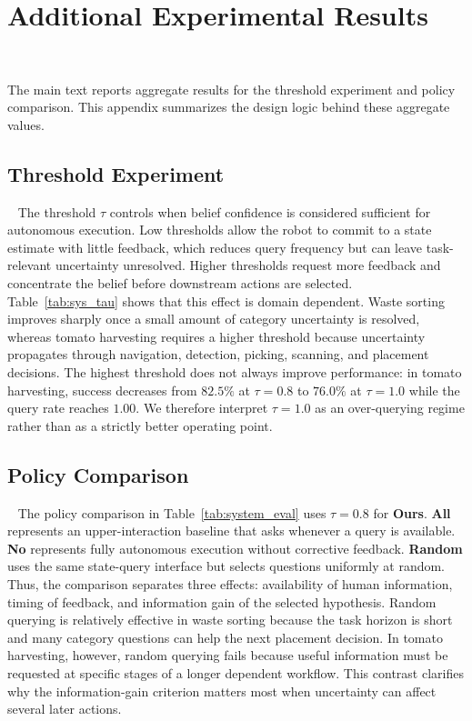 \section{Additional Experimental Results}~\label{appx:exp}

The main text reports aggregate results for the threshold experiment and policy comparison. This appendix summarizes the design logic behind these aggregate values.

\subsection{Threshold Experiment}~\label{appx:threshold_exp}
The threshold $\tau$ controls when belief confidence is considered sufficient for autonomous execution. Low thresholds allow the robot to commit to a state estimate with little feedback, which reduces query frequency but can leave task-relevant uncertainty unresolved. Higher thresholds request more feedback and concentrate the belief before downstream actions are selected. Table~\ref{tab:sys_tau} shows that this effect is domain dependent. Waste sorting improves sharply once a small amount of category uncertainty is resolved, whereas tomato harvesting requires a higher threshold because uncertainty propagates through navigation, detection, picking, scanning, and placement decisions. The highest threshold does not always improve performance: in tomato harvesting, success decreases from $82.5\%$ at $\tau=0.8$ to $76.0\%$ at $\tau=1.0$ while the query rate reaches $1.00$. We therefore interpret $\tau=1.0$ as an over-querying regime rather than as a strictly better operating point.

\subsection{Policy Comparison}~\label{appx:policy_comparison}
The policy comparison in Table~\ref{tab:system_eval} uses $\tau=0.8$ for \textbf{Ours}. \textbf{All} represents an upper-interaction baseline that asks whenever a query is available. \textbf{No} represents fully autonomous execution without corrective feedback. \textbf{Random} uses the same state-query interface but selects questions uniformly at random. Thus, the comparison separates three effects: availability of human information, timing of feedback, and information gain of the selected hypothesis. Random querying is relatively effective in waste sorting because the task horizon is short and many category questions can help the next placement decision. In tomato harvesting, however, random querying fails because useful information must be requested at specific stages of a longer dependent workflow. This contrast clarifies why the information-gain criterion matters most when uncertainty can affect several later actions.

